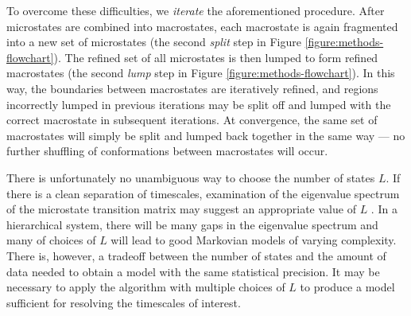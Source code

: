 To overcome these difficulties, we \emph{iterate} the aforementioned procedure.
After microstates are combined into macrostates, each macrostate is again fragmented into a new set of microstates (the second \emph{split} step in Figure \ref{figure:methods-flowchart}).
The refined set of all microstates is then lumped to form refined macrostates (the second \emph{lump} step in Figure \ref{figure:methods-flowchart}).
In this way, the boundaries between macrostates are iteratively refined, and regions incorrectly lumped in previous iterations may be split off and lumped with the correct macrostate in subsequent iterations.
At convergence, the same set of macrostates will simply be split and lumped back together in the same way --- no further shuffling of conformations between macrostates will occur.

There is unfortunately no unambiguous way to choose the number of states $L$.
If there is a clean separation of timescales, examination of the eigenvalue spectrum of the microstate transition matrix may suggest an appropriate value of $L$ \cite{schuette:2002b}.
In a hierarchical system, there will be many gaps in the eigenvalue spectrum and many of choices of $L$ will lead to good Markovian models of varying complexity.
There is, however, a tradeoff between the number of states and the amount of data needed to obtain a model with the same statistical precision.
It may be necessary to apply the algorithm with multiple choices of $L$ to produce a model sufficient for resolving the timescales of interest.


